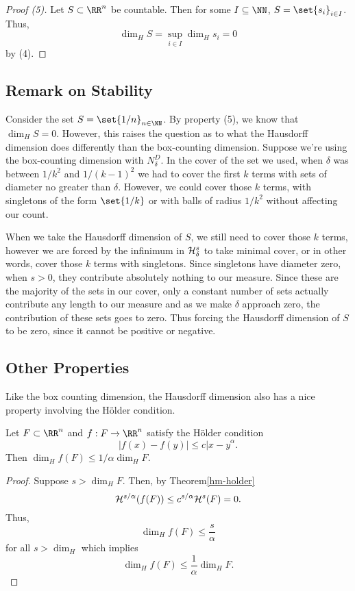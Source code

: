 \begin{proof}[Proof (5)]
	Let $S\subset\RR^n$ be countable.
	Then for some $I\subseteq\NN$, $S=\set{s_i}_{i\in I}$.
	Thus,
	\[
		\dim_H S = \sup\limits_{i\in I} \dim_H s_i = 0
	\]
	by (4).
\end{proof}

\subsection{Remark on Stability}

Consider the set $S=\set{1/n}_{n\in\NN}$.
By property (5), we know that $\dim_H S=0$.
However, this raises the question as to what the Hausdorff dimension does differently than the box-counting dimension.
Suppose we're using the box-counting dimension with $N^D_\delta$.
In the cover of the set we used, when $\delta$ was between $1/k^2$ and $1/{(k-1)}^2$ we had to cover the first $k$ terms with sets of diameter no greater than $\delta$.
However, we could cover those $k$ terms, with singletons of the form $\set{1/k}$ or with balls of radius ${1/k^2}$ without affecting our count.

When we take the Hausdorff dimension of $S$, we still need to cover those $k$ terms, however we are forced by the infinimum in $\mathcal{H}^s_\delta$ to take minimal cover, or in other words, cover those $k$ terms with singletons.
Since singletons have diameter zero, when $s>0$, they contribute absolutely nothing to our measure.
Since these are the majority of the sets in our cover, only a constant number of sets actually contribute any length to our measure and as we make $\delta$ approach zero, the contribution of these sets goes to zero.
Thus forcing the Hausdorff dimension of $S$ to be zero, since it cannot be positive or negative.

\subsection{Other Properties}

Like the box counting dimension, the Hausdorff dimension also has a nice property involving the H\"older condition.

\begin{thm}
	Let $F\subset\RR^n$ and $f:F\rightarrow\RR^n$ satisfy the H\"older condition
	\[
		|f(x)-f(y)|\leq c{|x-y}^\alpha.
	\]
	Then $\dim_H f(F) \leq 1/\alpha \dim_H F$.
\end{thm}

\begin{proof}
	Suppose $s>\dim_H F$.
	Then, by Theorem\autoref{hm-holder}
	\[
		\mathcal{H}^{s/\alpha}(f(F))\leq c^{s/\alpha}\mathcal{H}^s(F)=0.
	\]
	Thus,
	\[
		\dim_H f(F) \leq \frac{s}{\alpha}
	\]
	for all $s > \dim_H$ which implies
	\[
		\dim_H f(F) \leq \frac{1}{\alpha}\dim_H F.
	\]
\end{proof}

